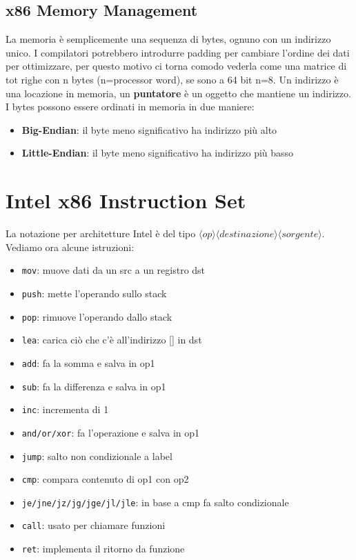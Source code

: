 \subsection{x86 Memory Management}
La memoria è semplicemente una sequenza di bytes,
ognuno con un indirizzo unico. I compilatori potrebbero
introdurre padding per cambiare l'ordine dei dati per ottimizzare,
per questo motivo ci torna comodo vederla come una matrice di tot
righe con n bytes (n=processor word), se sono a 64 bit n=8. Un
indirizzo è una locazione in memoria, un \textbf{puntatore} è un
oggetto che mantiene un indirizzo. I bytes possono essere ordinati
in memoria in due maniere:
\begin{itemize}
\item \textbf{Big-Endian}: il byte meno significativo ha indirizzo più alto
\item \textbf{Little-Endian}: il byte meno significativo ha indirizzo più basso
\end{itemize}

\section{Intel x86 Instruction Set}
La notazione per architetture Intel è del tipo $\langle op\rangle \langle
destinazione\rangle\langle sorgente\rangle$. Vediamo ora alcune istruzioni:
\begin{itemize}
\item \texttt{mov}: muove dati da un src a un registro dst
\item \texttt{push}: mette l'operando sullo stack
\item \texttt{pop}: rimuove l'operando dallo stack
\item \texttt{lea}: carica ciò che c'è all'indirizzo [] in dst
\item \texttt{add}: fa la somma e salva in op1
\item \texttt{sub}: fa la differenza e salva in op1
\item \texttt{inc}: incrementa di 1
\item \texttt{and/or/xor}: fa l'operazione e salva in op1
\item \texttt{jump}: salto non condizionale a label
\item \texttt{cmp}: compara contenuto di op1 con op2
\item \texttt{je/jne/jz/jg/jge/jl/jle}: in base a cmp fa salto condizionale 
\item \texttt{call}: usato per chiamare funzioni
\item \texttt{ret}: implementa il ritorno da funzione
\end{itemize}

